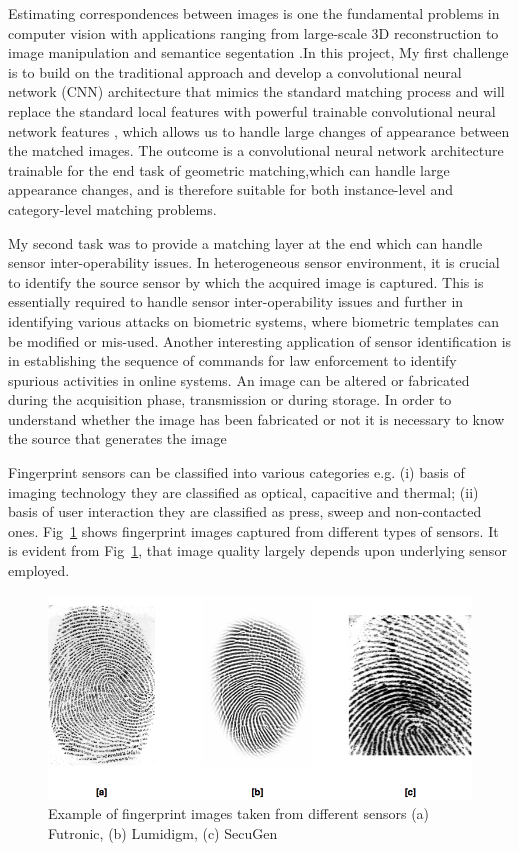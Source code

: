 \documentclass[12pt, a4paper,twoside]{article}
\begin{document}
\label{sec:workDone}
	Estimating correspondences between images is one the fundamental problems in computer vision\cite{20AA} with applications ranging from large-scale 3D reconstruction to image manipulation and semantice segentation \cite{44AA}.In this project, My first challenge is to build on the traditional approach and develop a convolutional neural network (CNN) architecture that mimics the standard matching process and will replace the standard local features with powerful trainable convolutional neural network features \cite{33AA}, which allows us to handle large changes of appearance between the matched images. The outcome is a convolutional neural network architecture trainable for the end task of geometric matching,which can handle large appearance changes, and is therefore suitable for both instance-level and category-level matching problems. 

	My second task was to provide a matching layer at the end which can handle sensor inter-operability issues. In heterogeneous sensor environment, it is crucial to identify the source sensor by which the acquired image is captured. This is essentially required to handle sensor inter-operability issues and further in identifying various attacks on biometric systems, where biometric templates can be modified or mis-used. Another interesting application of sensor identification is in establishing the sequence of commands for law enforcement to identify spurious activities in online systems. An image can be altered or fabricated during the acquisition phase, transmission or during storage. In order to understand whether the image has been fabricated or not it is necessary to know the source that generates the image

	Fingerprint sensors can be classified into various categories e.g. (i) basis of imaging technology they are classified as optical, capacitive and thermal; (ii) basis of user interaction they are classified as press, sweep and non-contacted ones. Fig~\ref{fig:figure2} shows fingerprint images captured from different types of sensors. It is evident from Fig~\ref{fig:figure2}, that image quality largely depends upon underlying sensor employed.

\begin{figure}[htbp]
\centering
\includegraphics[scale=0.5]{images/differentSensorsOutputs}
\caption{Example of fingerprint images taken from different sensors (a) Futronic, (b) Lumidigm, (c) SecuGen
}\label{fig:figure2}
\end{figure}
\end{document}
